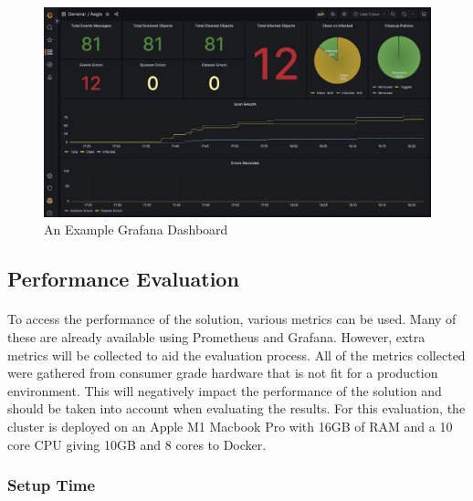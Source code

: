 \documentclass[12pt, conference, final, a4paper, onecolumn, compsoc]{IEEEtran}
\begin{document}
\begin{figure}[H]
  \centering \includegraphics[scale=0.31]{images/grafana.png}
  \caption{An Example Grafana Dashboard}
  \label{fig:grafana}
\end{figure}

\subsection{Performance Evaluation}
\paragraph{}


To access the performance of the solution, various metrics can be used. Many of
these are already available using Prometheus and Grafana. However, extra metrics
will be collected to aid the evaluation process. All of the metrics collected
were gathered from consumer grade hardware that is not fit for a production
environment. This will negatively impact the performance of the solution and
should be taken into account when evaluating the results. For this evaluation,
the cluster is deployed on an Apple M1 Macbook Pro with 16GB of RAM and a 10
core CPU giving 10GB and 8 cores to Docker.

\subsubsection*{Setup Time}
\paragraph{}
\end{document}
